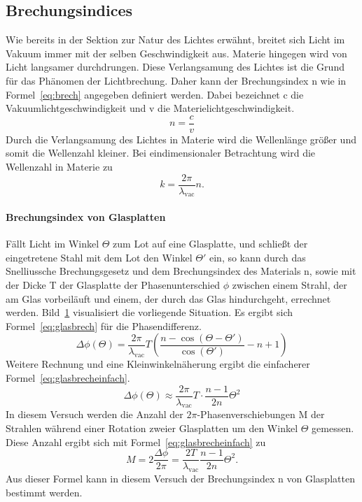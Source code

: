 \subsection{Brechungsindices}
Wie bereits in der Sektion zur Natur des Lichtes erwähnt, 
breitet sich Licht im Vakuum immer mit der selben Geschwindigkeit 
aus. Materie hingegen wird von Licht langsamer durchdrungen. 
Diese Verlangsamung des Lichtes ist die Grund für das Phänomen der 
Lichtbrechung. Daher kann der Brechungsindex n wie in 
Formel~\eqref{eq:brech} 
angegeben definiert werden. Dabei bezeichnet c die 
Vakuumlichtgeschwindigkeit und v die Materielichtgeschwindigkeit.
\begin{equation}
n = \frac{c}{v}
\label{eq:brech}
\end{equation}
Durch die Verlangsamung des Lichtes in Materie wird die Wellenlänge 
größer und somit die Wellenzahl kleiner. Bei eindimensionaler 
Betrachtung wird die Wellenzahl in Materie zu
\begin{equation*}
k = \frac{2\pi}{\lambda_\text{vac}}n.
\end{equation*}
\paragraph{Brechungsindex von Glasplatten}
%
\begin{figure}
\centering
\label{fig:brechglas}
\end{figure}
%
Fällt Licht im Winkel $\Theta$ zum Lot auf eine Glasplatte, 
und schließt der eingetretene Stahl mit dem Lot den Winkel $\Theta'$ ein, 
so kann durch das 
Snelliussche Brechungsgesetz und dem Brechungsindex des Materials n, 
sowie mit der Dicke T der Glasplatte der Phasenunterschied $\phi$ zwischen 
einem Strahl, der am Glas vorbeiläuft und einem, der durch das Glas 
hindurchgeht, errechnet werden. 
Bild~\ref{fig:brechglas} visualisiert die vorliegende Situation.
Es ergibt sich 
Formel~\eqref{eq:glasbrech} für die Phasendifferenz.
\begin{equation}
\Delta\phi(\Theta) = \frac{2\pi}{\lambda_\text{vac}}T\left(
\frac{n-\cos(\Theta - \Theta')}{\cos(\Theta')} - n+1\right)
\label{eq:glasbrech}
\end{equation}
Weitere Rechnung und eine Kleinwinkelnäherung ergibt die einfacherer 
Formel~\eqref{eq:glasbrecheinfach}.
\begin{equation}
\Delta\phi(\Theta) \approx \frac{2\pi}{\lambda_\text{vac}}T\cdot
\frac{n-1}{2n}\Theta^2
\label{eq:glasbrecheinfach}
\end{equation}
In diesem Versuch werden die Anzahl der $2\pi$-Phasenverschiebungen M
der Strahlen während einer Rotation zweier Glasplatten um den Winkel 
$\Theta$ gemessen. Diese Anzahl ergibt sich mit 
Formel~\eqref{eq:glasbrecheinfach} zu
\begin{equation}
M = 2\frac{\Delta\phi}{2\pi} = \frac{2T}{\lambda_\text{vac}}
\frac{n-1}{2n}\Theta^2.
\label{eq:glasfringes}
\end{equation}
Aus dieser Formel kann in diesem Versuch der Brechungsindex n von 
Glasplatten bestimmt werden.\\
